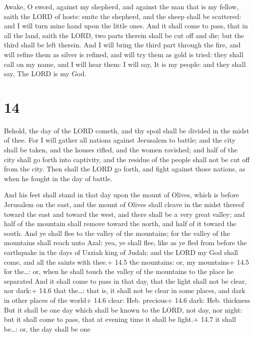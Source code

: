  Awake, O sword, against my shepherd, and against the man
that is my fellow, saith the LORD of hosts: smite the shepherd, and the
sheep shall be scattered: and I will turn mine hand upon the little
ones.  And it shall come to pass, that in all the land,
saith the LORD, two parts therein shall be cut off and die; but the
third shall be left therein.  And I will bring the third
part through the fire, and will refine them as silver is refined, and
will try them as gold is tried: they shall call on my name, and I will
hear them: I will say, It is my people: and they shall say, The LORD is
my God.

\hypertarget{section-13}{%
\section{14}\label{section-13}}

 Behold, the day of the LORD cometh, and thy spoil shall be
divided in the midst of thee.  For I will gather all nations
against Jerusalem to battle; and the city shall be taken, and the houses
rifled, and the women ravished; and half of the city shall go forth into
captivity, and the residue of the people shall not be cut off from the
city.  Then shall the LORD go forth, and fight against those
nations, as when he fought in the day of battle.

 And his feet shall stand in that day upon the mount of
Olives, which is before Jerusalem on the east, and the mount of Olives
shall cleave in the midst thereof toward the east and toward the west,
and there shall be a very great valley; and half of the mountain shall
remove toward the north, and half of it toward the south. 
And ye shall flee to the valley of the mountains; for the valley of the
mountains shall reach unto Azal: yea, ye shall flee, like as ye fled
from before the earthquake in the days of Uzziah king of Judah: and the
LORD my God shall come, and all the saints with thee.+ 14.5 the
mountains: or, my mountains+ 14.5 for the\ldots: or, when he shall touch
the valley of the mountains to the place he separated  And
it shall come to pass in that day, that the light shall not be clear,
nor dark:+ 14.6 that the\ldots: that is, it shall not be clear in some
places, and dark in other places of the world+ 14.6 clear: Heb.
precious+ 14.6 dark: Heb. thickness  But it shall be one day
which shall be known to the LORD, not day, nor night: but it shall come
to pass, that at evening time it shall be light.+ 14.7 it shall
be\ldots: or, the day shall be one

